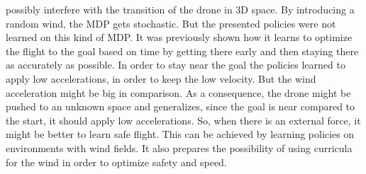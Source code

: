 possibly interfere with the transition of the drone in 3D space.
By introducing a random wind, the MDP gets stochastic. But the presented policies were not 
learned on this kind of MDP. It was previously shown how it learns to optimize 
the flight to the goal based on time by getting there early and then staying there as accurately as possible.
In order to stay near the goal the policies learned to apply low accelerations, 
in order to keep the low velocity. But the wind acceleration might be big 
in comparison. As a consequence, the drone might be pushed to an unknown space 
and generalizes, since the goal is near compared to the start, it should apply low 
accelerations.
So, when there is an external force, it might be better to learn safe flight.
This can be achieved by learning policies on environments with wind fields.
It also prepares the possibility of using curricula for the wind in order to optimize safety and speed.

